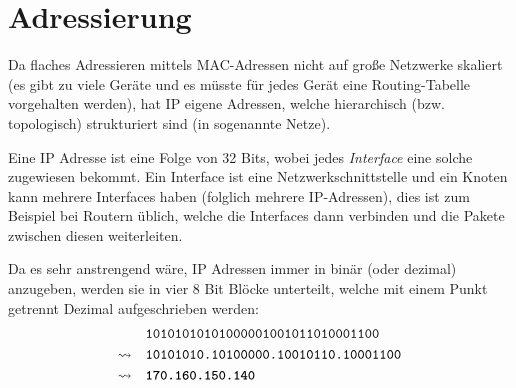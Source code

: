     \section{Adressierung}
        Da flaches Adressieren mittels MAC-Adressen nicht auf große Netzwerke skaliert (es gibt zu viele Geräte und es müsste für jedes Gerät eine Routing-Tabelle vorgehalten werden), hat IP eigene Adressen, welche hierarchisch (bzw. topologisch) strukturiert sind (in sogenannte Netze).
        
        Eine IP Adresse ist eine Folge von 32 Bits, wobei jedes \textit{Interface} eine solche zugewiesen bekommt. Ein Interface ist eine Netzwerkschnittstelle und ein Knoten kann mehrere Interfaces haben (folglich mehrere IP-Adressen), dies ist zum Beispiel bei Routern üblich, welche die Interfaces dann verbinden und die Pakete zwischen diesen weiterleiten.
        
        Da es sehr anstrengend wäre, IP Adressen immer in binär (oder dezimal) anzugeben, werden sie in vier 8 Bit Blöcke unterteilt, welche mit einem Punkt getrennt Dezimal aufgeschrieben werden:
        \begin{align*}
        	                 & \quad\texttt{10101010101000001001011010001100}    \\
        	\rightsquigarrow & \quad\texttt{10101010.10100000.10010110.10001100} \\
        	\rightsquigarrow & \quad\textbf{\texttt{170.160.150.140}}
        \end{align*}
        
